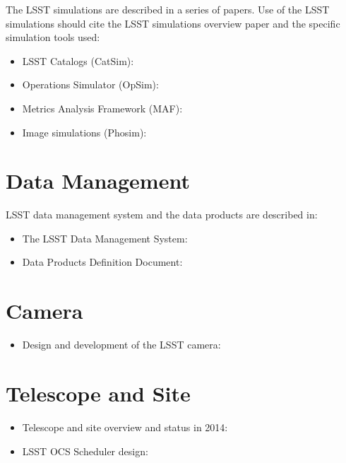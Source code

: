 \documentclass[12pt]{article}
\begin{document}
The LSST simulations are described in a series of papers. Use of the LSST simulations should cite the LSST simulations overview paper \cite{2014SPIE.9150E..14C} and the specific simulation tools used:

\begin{itemize}
\item LSST Catalogs (CatSim): \cite{2014SPIE.9150E..14C}
\item Operations Simulator (OpSim): \cite{2014SPIE.9150E..15D}
\item Metrics Analysis Framework (MAF): \cite{2014SPIE.9149E..0BJ}
\item Image simulations (Phosim): \cite{0067-0049-218-1-14}
\end{itemize}


\section{Data Management}

LSST data management system and the data products are described in: 

\begin{itemize}
  \item The LSST Data Management System: \cite{2015arXiv151207914J}
  \item Data Products Definition Document: \cite{DPDD}
\end{itemize}


\section{Camera}

\begin{itemize}
   \item Design and development of the LSST camera: \cite{2010SPIE.7735E..0JK}
\end{itemize}


\section{Telescope and Site}

\begin{itemize}
   \item Telescope and site overview and status in 2014:  \cite{2014SPIE.9145E..1AG}
   \item LSST OCS Scheduler design: \cite{2014SPIE.9149E..0GD}
\end{itemize}
\end{document}

